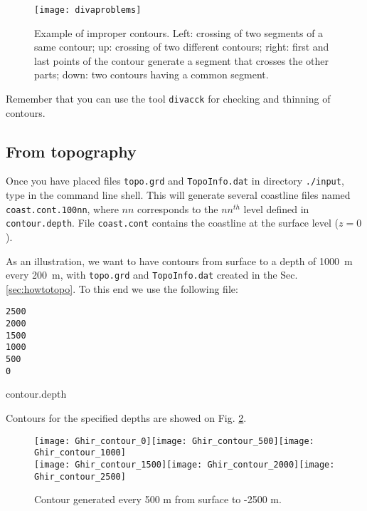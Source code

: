 \begin{figure}[H]
\centering
\parbox{.5\textwidth}{
\texttt{[image: divaproblems]}
}\parbox{.5\textwidth}{\caption[Example of improper contours.]{Example of improper contours. Left: crossing of two segments of a same contour; up: crossing of two different contours; right: first and last points of the contour generate a segment that crosses the other parts; down: two contours having a common segment.\label{divaprob}}
}
\end{figure}

Remember that you can use the tool \texttt{divacck} for checking and thinning of contours.


\subsection{From topography\label{sec:contourtopo}}


Once you have placed files \texttt{topo.grd} and \texttt{TopoInfo.dat} in directory \texttt{./input}, type  in the command line shell. This will generate several coastline files named \texttt{coast.cont.100nn}, where $nn$ corresponds to the $nn^{th}$ level defined in \texttt{contour.depth}. File \texttt{coast.cont} contains the coastline at the surface level ($z=0$).

As an illustration, we want to have contours from surface to a depth of \mbox{1000 m} every \mbox{200 m}, with \texttt{topo.grd} and \texttt{TopoInfo.dat} created in the Sec. \ref{sec:howtotopo}. To this end we use the following file:

\begin{exfile}[htpb]
\begin{footnotesize}
\begin{verbatim}
2500
2000
1500
1000
500
0
\end{verbatim}
\end{footnotesize}
\caption{contour.depth\label{contourdepth}}
\end{exfile}

Contours for the specified depths are showed on Fig. \ref{fig:contourdepth}.


\begin{figure}[htpb]
\centering
\texttt{[image: Ghir\_contour\_0]}\texttt{[image: Ghir\_contour\_500]}\texttt{[image: Ghir\_contour\_1000]}\\
\texttt{[image: Ghir\_contour\_1500]}\texttt{[image: Ghir\_contour\_2000]}\texttt{[image: Ghir\_contour\_2500]}

\caption{Contour generated every 500 m from surface to -2500 m.\label{fig:contourdepth}}
\end{figure}

